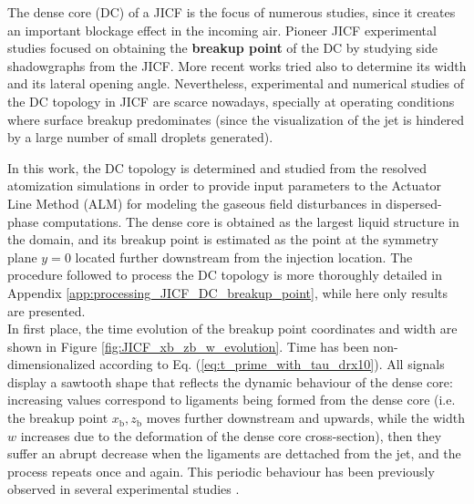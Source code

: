 The dense core (DC) of a JICF is the focus of numerous studies, since it creates an important blockage effect in the incoming air. Pioneer JICF experimental studies \citepColor[wu_breakup_1997] focused on obtaining the \textbf{breakup point} of the DC by studying side shadowgraphs from the JICF. More recent works  tried also to determine its width and its lateral opening angle. Nevertheless, experimental and numerical studies of the DC topology in JICF are scarce nowadays, specially at operating conditions where surface breakup predominates (since the visualization of the jet is hindered by a large number of small droplets generated). 

In this work, the DC topology is determined and studied from the resolved atomization simulations in order to provide input parameters to the Actuator Line Method (ALM) for modeling the gaseous field disturbances in dispersed-phase computations. The dense core is obtained as the largest liquid structure in the domain, and its breakup point is estimated as the point at the symmetry plane $y = 0$ located further downstream from the injection location. The procedure followed to process the DC topology is more thoroughly detailed in Appendix \ref{app:processing_JICF_DC_breakup_point}, while here only results are presented. \\


In first place, the time evolution of the breakup point coordinates and width are shown in Figure \ref{fig:JICF_xb_zb_w_evolution}. Time has been non-dimensionalized according to Eq. (\ref{eq:t_prime_with_tau_drx10}). All signals display a sawtooth shape that reflects the dynamic behaviour of the dense core: increasing values correspond to ligaments being formed from the dense core (i.e. the breakup point $x_\mathrm{b}, z_\mathrm{b}$ moves further downstream and upwards, while the width $w$ increases due to the deformation of the dense core cross-section), then they suffer an abrupt decrease when the ligaments are dettached from the jet, and the process repeats once and again.  This periodic behaviour has been previously observed in several experimental studies  .

